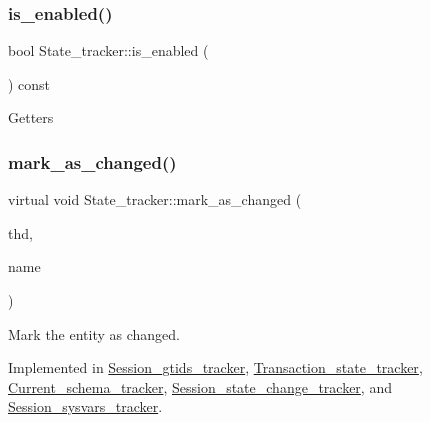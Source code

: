 \subsubsection{\texorpdfstring{is\+\_\+enabled()}{is\_enabled()}}
{\footnotesize\ttfamily bool State\+\_\+tracker\+::is\+\_\+enabled (\begin{DoxyParamCaption}{ }\end{DoxyParamCaption}) const\hspace{0.3cm}{\ttfamily [inline]}}

Getters \mbox{\label{classState__tracker_afb865d3837c0f8fc9cd36d5234142b32}} 
\subsubsection{\texorpdfstring{mark\+\_\+as\+\_\+changed()}{mark\_as\_changed()}}
{\footnotesize\ttfamily virtual void State\+\_\+tracker\+::mark\+\_\+as\+\_\+changed (\begin{DoxyParamCaption}\item[{T\+HD $\ast$}]{thd,  }\item[{L\+E\+X\+\_\+\+C\+S\+T\+R\+I\+NG $\ast$}]{name }\end{DoxyParamCaption})\hspace{0.3cm}{\ttfamily [pure virtual]}}

Mark the entity as changed. 

Implemented in \mbox{\hyperlink{classSession__gtids__tracker_a2c2c7bed399a66fda5748d1a6407b8f8}{Session\+\_\+gtids\+\_\+tracker}}, \mbox{\hyperlink{classTransaction__state__tracker_a5afd4fcf4c13dcaf68811246a153d72f}{Transaction\+\_\+state\+\_\+tracker}}, \mbox{\hyperlink{classCurrent__schema__tracker_a5b7b338910bed0627c6312b9de307dde}{Current\+\_\+schema\+\_\+tracker}}, \mbox{\hyperlink{classSession__state__change__tracker_a584fe743f65ba30c3edcde930eb17d16}{Session\+\_\+state\+\_\+change\+\_\+tracker}}, and \mbox{\hyperlink{classSession__sysvars__tracker_adeca89d5fa8be0279ec522c7afd8fcae}{Session\+\_\+sysvars\+\_\+tracker}}.

\mbox{\label{classState__tracker_aee5cd5c5ed19fbd4c8ac01dbd62471e7}} 
